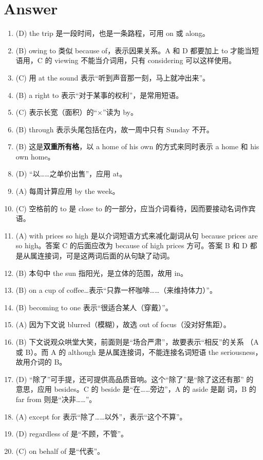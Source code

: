\section{Answer}
\begin{enumerate}
\item (D) the trip 是一段时间，也是一条路程，可用 on 或 along。

\item (B) owing to 类似 because of，表示因果关系。A 和 D 都要加上 to 才能当短语用，C 的 viewing 不能当介词用，只有 considering 可以这样使用。

\item (C) 用 at the sound 表示“听到声音那一刻，马上就冲出来”。


\item  (B) a right to 表示“对于某事的权利”，是常用短语。

\item  (C) 表示长宽（面积）的“×”读为 by。

\item  (B) through 表示头尾包括在内，故一周中只有 Sunday 不开。

\item (B) 这是\textbf{双重所有格}，以 a home of his own 的方式来同时表示 a
  home 和 his own home。

\item  (D) “以……之单价出售”，应用 at。

\item  (A) 每周计算应用 by the week。

\item (C) 空格前的 to 是 close to 的一部分，应当介词看待，因而要接动名词作宾语。

\item (A) with prices so high 是以介词短语方式来减化副词从句 because prices
  are so high。答案 C 的后面应改为 because of high prices 方可。答案 B 和 D
  都是从属连接词，可是这两词后面的从句缺了动词。

\item (B) 本句中 the sun 指阳光，是立体的范围，故用 in。
\item (B) on a cup of coffee…表示“只靠一杯咖啡……（来维持体力）”。
\item (B) becoming to one 表示“很适合某人（穿戴）”。

\item  (A) 因为下文说 blurred（模糊），故选 out of focus（没对好焦距）。
\item (B) 下文说观众哄堂大笑，前面则是“场合严肃”，故要表示“相反”的关系
  （A 或 B）。而 A 的 although 是从属连接词，不能连接名词短语 the
  seriousness，故用介词的 B。

\item (D) “除了”可手提，还可提供高品质音响。这个“除了”是“除了这还有那” 的
  意思，应用 besides。C 的 beside 是“在……旁边”，A 的 aside 是副
  词，B 的 far from 则是“决非……”。

\item (A) except for 表示“除了……以外”，表示“这个不算”。
\item (D) regardless of 是“不顾，不管”。
\item  (C) on behalf of 是“代表”。

\end{enumerate}

